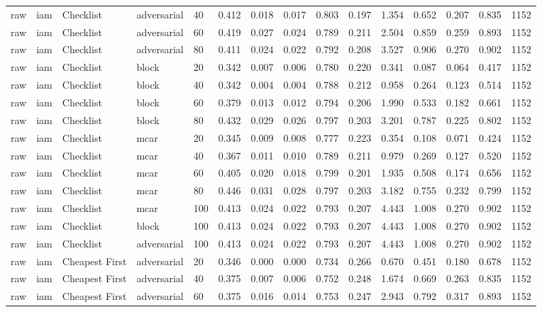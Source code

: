 \begin{table}[!ht]
{\begin{tabular}{lllllllllllllll}
raw & iam & Checklist & adversarial & 40 & 0.412 & 0.018 & 0.017 & 0.803 & 0.197 & 1.354 & 0.652 & 0.207 & 0.835 & 1152 \\
raw & iam & Checklist & adversarial & 60 & 0.419 & 0.027 & 0.024 & 0.789 & 0.211 & 2.504 & 0.859 & 0.259 & 0.893 & 1152 \\
raw & iam & Checklist & adversarial & 80 & 0.411 & 0.024 & 0.022 & 0.792 & 0.208 & 3.527 & 0.906 & 0.270 & 0.902 & 1152 \\
raw & iam & Checklist & block & 20 & 0.342 & 0.007 & 0.006 & 0.780 & 0.220 & 0.341 & 0.087 & 0.064 & 0.417 & 1152 \\
raw & iam & Checklist & block & 40 & 0.342 & 0.004 & 0.004 & 0.788 & 0.212 & 0.958 & 0.264 & 0.123 & 0.514 & 1152 \\
raw & iam & Checklist & block & 60 & 0.379 & 0.013 & 0.012 & 0.794 & 0.206 & 1.990 & 0.533 & 0.182 & 0.661 & 1152 \\
raw & iam & Checklist & block & 80 & 0.432 & 0.029 & 0.026 & 0.797 & 0.203 & 3.201 & 0.787 & 0.225 & 0.802 & 1152 \\
raw & iam & Checklist & mcar & 20 & 0.345 & 0.009 & 0.008 & 0.777 & 0.223 & 0.354 & 0.108 & 0.071 & 0.424 & 1152 \\
raw & iam & Checklist & mcar & 40 & 0.367 & 0.011 & 0.010 & 0.789 & 0.211 & 0.979 & 0.269 & 0.127 & 0.520 & 1152 \\
raw & iam & Checklist & mcar & 60 & 0.405 & 0.020 & 0.018 & 0.799 & 0.201 & 1.935 & 0.508 & 0.174 & 0.656 & 1152 \\
raw & iam & Checklist & mcar & 80 & 0.446 & 0.031 & 0.028 & 0.797 & 0.203 & 3.182 & 0.755 & 0.232 & 0.799 & 1152 \\
raw & iam & Checklist & mcar & 100 & 0.413 & 0.024 & 0.022 & 0.793 & 0.207 & 4.443 & 1.008 & 0.270 & 0.902 & 1152 \\
raw & iam & Checklist & block & 100 & 0.413 & 0.024 & 0.022 & 0.793 & 0.207 & 4.443 & 1.008 & 0.270 & 0.902 & 1152 \\
raw & iam & Checklist & adversarial & 100 & 0.413 & 0.024 & 0.022 & 0.793 & 0.207 & 4.443 & 1.008 & 0.270 & 0.902 & 1152 \\
raw & iam & Cheapest First & adversarial & 20 & 0.346 & 0.000 & 0.000 & 0.734 & 0.266 & 0.670 & 0.451 & 0.180 & 0.678 & 1152 \\
raw & iam & Cheapest First & adversarial & 40 & 0.375 & 0.007 & 0.006 & 0.752 & 0.248 & 1.674 & 0.669 & 0.263 & 0.835 & 1152 \\
raw & iam & Cheapest First & adversarial & 60 & 0.375 & 0.016 & 0.014 & 0.753 & 0.247 & 2.943 & 0.792 & 0.317 & 0.893 & 1152 \\

\end{tabular}}
\end{table}
